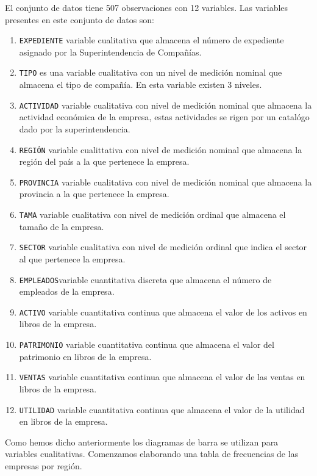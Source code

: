 \documentclass[letterpaper,]{book}
\providecommand{\tightlist}{%
  \setlength{\itemsep}{0pt}\setlength{\parskip}{0pt}}
\begin{document}
El conjunto de datos tiene 507 observaciones con 12 variables. Las variables presentes en este conjunto de datos son:

\begin{enumerate}
\def\labelenumi{\arabic{enumi}.}
\tightlist
\item
  \texttt{EXPEDIENTE} variable cualitativa que almacena el número de expediente asignado por la Superintendencia de Compañías.
\item
  \texttt{TIPO} es una variable cualitativa con un nivel de medición nominal que almacena el tipo de compañía. En esta variable existen 3 niveles.
\item
  \texttt{ACTIVIDAD} variable cualitativa con nivel de medición nominal que almacena la actividad económica de la empresa, estas actividades se rigen por un catalógo dado por la superintendencia.
\item
  \texttt{REGIÓN} variable cualittativa con nivel de medición nominal que almacena la región del país a la que pertenece la empresa.
\item
  \texttt{PROVINCIA} variable cualitativa con nivel de medición nominal que almacena la provincia a la que pertenece la empresa.
\item
  \texttt{TAMA} variable cualitativa con nivel de medición ordinal que almacena el tamaño de la empresa.
\item
  \texttt{SECTOR} variable cualitativa con nivel de medición ordinal que indica el sector al que pertenece la empresa.
\item
  \texttt{EMPLEADOS}variable cuantitativa discreta que almacena el número de empleados de la empresa.
\item
  \texttt{ACTIVO} variable cuantitativa continua que almacena el valor de los activos en libros de la empresa.
\item
  \texttt{PATRIMONIO} variable cuantitativa continua que almacena el valor del patrimonio en libros de la empresa.
\item
  \texttt{VENTAS} variable cuantitativa continua que almacena el valor de las ventas en libros de la empresa.
\item
  \texttt{UTILIDAD} variable cuantitativa continua que almacena el valor de la utilidad en libros de la empresa.
\end{enumerate}

Como hemos dicho anteriormente los diagramas de barra se utilizan para variables cualitativas. Comenzamos elaborando una tabla de frecuencias de las empresas por región.
\end{document}
